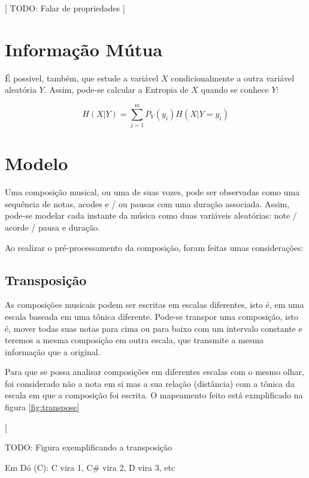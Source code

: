 [ TODO: Falar de propriedades ]

\section{Informação Mútua}

É possivel, também, que estude a variável $X$ condicionalmente a outra variável aleatória $Y$. Assim, pode-se calcular a Entropia de $X$ quando se conhece $Y$:

\begin{equation}
    H(X|Y) =  \sum_{j=1}^{m} P_Y(y_i) H(X|Y = y_i)
\end{equation}


\section{Modelo}

Uma composição musical, ou uma de suas vozes, pode ser observadas como uma sequência de notas, acodes e / ou pausas com uma duração associada. Assim, pode-se modelar cada instante da música como duas variáveis aleatórias: note / acorde / pausa e duração.

Ao realizar o pré-processamento da composição, foram feitas umas considerações:


\subsection{Transposição}

As composições musicais podem ser escritas em escalas diferentes, isto é, em uma escala baseada em uma tônica diferente. Pode-se transpor uma composição, isto é, mover todas suas notas para cima ou para baixo com um intervalo constante e teremos a mesma composição em outra escala, que transmite a mesma informação que a original.

Para que se possa analisar composições em diferentes escalas com o mesmo olhar, foi considerado não a nota em si mas a sua relação (distância) com a tônica da escala em que a composição foi escrita. O mapeamento feito está exmplificado na figura \ref{fig:transpose}

[

TODO: Figura exemplificando a transposição

Em Dó (C): C vira 1, C\# vira 2, D vira 3, etc

